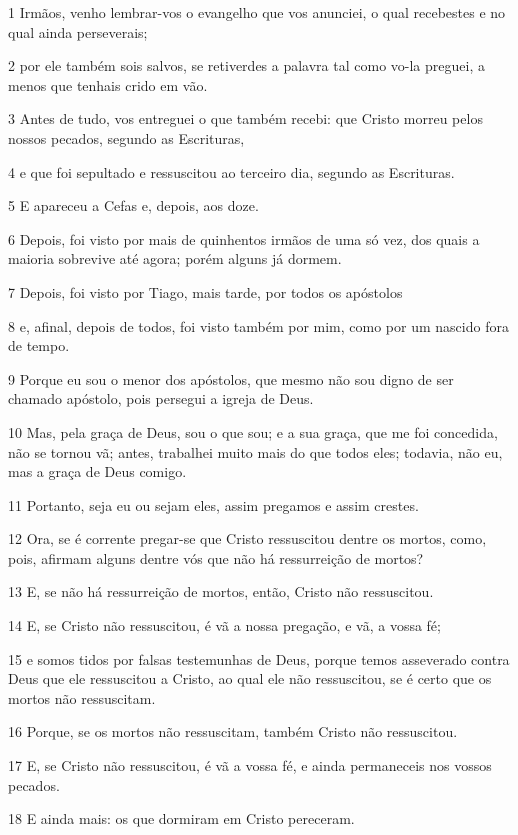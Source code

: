 \par 1 Irmãos, venho lembrar-vos o evangelho que vos anunciei, o qual recebestes e no qual ainda perseverais;
\par 2 por ele também sois salvos, se retiverdes a palavra tal como vo-la preguei, a menos que tenhais crido em vão.
\par 3 Antes de tudo, vos entreguei o que também recebi: que Cristo morreu pelos nossos pecados, segundo as Escrituras,
\par 4 e que foi sepultado e ressuscitou ao terceiro dia, segundo as Escrituras.
\par 5 E apareceu a Cefas e, depois, aos doze.
\par 6 Depois, foi visto por mais de quinhentos irmãos de uma só vez, dos quais a maioria sobrevive até agora; porém alguns já dormem.
\par 7 Depois, foi visto por Tiago, mais tarde, por todos os apóstolos
\par 8 e, afinal, depois de todos, foi visto também por mim, como por um nascido fora de tempo.
\par 9 Porque eu sou o menor dos apóstolos, que mesmo não sou digno de ser chamado apóstolo, pois persegui a igreja de Deus.
\par 10 Mas, pela graça de Deus, sou o que sou; e a sua graça, que me foi concedida, não se tornou vã; antes, trabalhei muito mais do que todos eles; todavia, não eu, mas a graça de Deus comigo.
\par 11 Portanto, seja eu ou sejam eles, assim pregamos e assim crestes.
\par 12 Ora, se é corrente pregar-se que Cristo ressuscitou dentre os mortos, como, pois, afirmam alguns dentre vós que não há ressurreição de mortos?
\par 13 E, se não há ressurreição de mortos, então, Cristo não ressuscitou.
\par 14 E, se Cristo não ressuscitou, é vã a nossa pregação, e vã, a vossa fé;
\par 15 e somos tidos por falsas testemunhas de Deus, porque temos asseverado contra Deus que ele ressuscitou a Cristo, ao qual ele não ressuscitou, se é certo que os mortos não ressuscitam.
\par 16 Porque, se os mortos não ressuscitam, também Cristo não ressuscitou.
\par 17 E, se Cristo não ressuscitou, é vã a vossa fé, e ainda permaneceis nos vossos pecados.
\par 18 E ainda mais: os que dormiram em Cristo pereceram.
